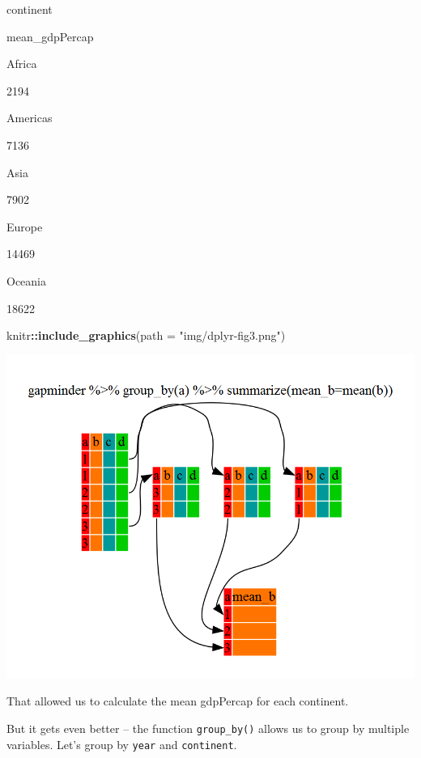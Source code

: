 \documentclass[]{book}
\newenvironment{Shaded}{\begin{snugshade}}{\end{snugshade}}
\newcommand{\KeywordTok}[1]{\textcolor[rgb]{0.13,0.29,0.53}{\textbf{#1}}}
\newcommand{\DataTypeTok}[1]{\textcolor[rgb]{0.13,0.29,0.53}{#1}}
\newcommand{\StringTok}[1]{\textcolor[rgb]{0.31,0.60,0.02}{#1}}
\newcommand{\OperatorTok}[1]{\textcolor[rgb]{0.81,0.36,0.00}{\textbf{#1}}}
\newcommand{\NormalTok}[1]{#1}
\begin{document}
continent

mean\_gdpPercap

Africa

2194

Americas

7136

Asia

7902

Europe

14469

Oceania

18622

\begin{Shaded}
\begin{Highlighting}[]
\NormalTok{knitr}\OperatorTok{::}\KeywordTok{include_graphics}\NormalTok{(}\DataTypeTok{path =} \StringTok{"img/dplyr-fig3.png"}\NormalTok{)}
\end{Highlighting}
\end{Shaded}

\begin{center}\includegraphics[width=0.7\linewidth]{img/dplyr-fig3} \end{center}

That allowed us to calculate the mean gdpPercap for each continent.

But it gets even better -- the function \texttt{group\_by()} allows us
to group by multiple variables. Let's group by \texttt{year} and
\texttt{continent}.

\begin{Shaded}
\end{Shaded}
\end{document}
